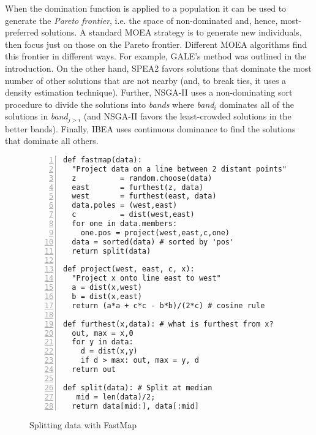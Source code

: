 \documentclass[10pt,journal,compsoc]{IEEEtran}
\begin{document}
When the domination function is applied to a
population it can be used to generate the {\em
  Pareto frontier}, i.e.  the space of non-dominated
and, hence, most-preferred solutions. A standard
MOEA strategy is to generate new individuals, then
focus just on those on the Pareto
frontier. Different MOEA algorithms find this
frontier in different ways.  For example, GALE's method
was outlined in the introduction.
On the other hand, SPEA2
favors solutions that dominate the most number of
other solutions that are not nearby (and, to break
ties, it uses a density estimation technique).  Further,
NSGA-II uses a non-dominating sort
procedure to divide the solutions into {\em bands}
where {\em band}$_i$ dominates all of the solutions
in {\em band}$_{j>i}$ (and NSGA-II favors the
least-crowded solutions in the better bands).
Finally, IBEA uses continuous dominance to find the
solutions that dominate all others.


\begin{figure}[!b]
\begin{lstlisting}[mathescape,frame=l,numbers=left]
def fastmap(data): 
  "Project data on a line between 2 distant points"
  z          = random.choose(data)
  east       = furthest(z, data)
  west       = furthest(east, data)
  data.poles = (west,east)
  c          = dist(west,east)     
  for one in data.members: 
    one.pos = project(west,east,c,one)
  data = sorted(data) # sorted by 'pos'
  return split(data)

def project(west, east, c, x): 
  "Project x onto line east to west"
  a = dist(x,west)
  b = dist(x,east)
  return (a*a + c*c - b*b)/(2*c) # cosine rule

def furthest(x,data): # what is furthest from x?
  out, max = x,0
  for y in data:
    d = dist(x,y)
    if d > max: out, max = y, d
  return out

def split(data): # Split at median
   mid = len(data)/2; 
  return data[mid:], data[:mid]
\end{lstlisting}

\caption{Splitting data with FastMap}
\label{fig:fastmapCode}   
\end{figure}
\end{document}

